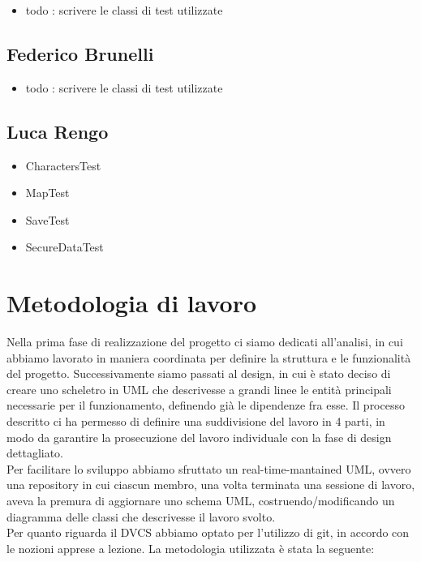 \begin{itemize}
	\item todo : scrivere le classi di test utilizzate
\end{itemize}

\subsection*{Federico Brunelli}

\begin{itemize}
	\item todo : scrivere le classi di test utilizzate
\end{itemize}

\subsection*{Luca Rengo}

\begin{itemize}
	\item \textsf{\small CharactersTest}
	\item \textsf{\small MapTest}
	\item \textsf{\small SaveTest}
	\item \textsf{\small SecureDataTest}
\end{itemize}



\section{Metodologia di lavoro}

Nella prima fase di realizzazione del progetto ci siamo dedicati all'analisi, in cui abbiamo lavorato in maniera coordinata per definire la struttura e le funzionalità del progetto.
Successivamente siamo passati al design, in cui è stato deciso di creare uno scheletro in UML che descrivesse a grandi linee le entità principali necessarie per il funzionamento, definendo già le dipendenze fra esse. Il processo descritto ci ha permesso di definire una suddivisione del lavoro in 4 parti, in modo da garantire la prosecuzione del lavoro individuale con la fase di design dettagliato. \\
Per facilitare lo sviluppo abbiamo sfruttato un real-time-mantained UML, ovvero una repository in cui ciascun membro, una volta terminata una sessione di lavoro, aveva la premura di aggiornare uno schema UML, costruendo/modificando un diagramma delle classi che descrivesse il lavoro svolto. \\
Per quanto riguarda il DVCS abbiamo optato per l'utilizzo di git, in accordo con le nozioni apprese a lezione. La metodologia utilizzata è stata la seguente:


